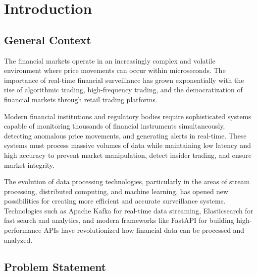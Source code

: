 \chapter{Introduction}

\section{General Context}

The financial markets operate in an increasingly complex and volatile environment where price movements can occur within microseconds. The importance of real-time financial surveillance has grown exponentially with the rise of algorithmic trading, high-frequency trading, and the democratization of financial markets through retail trading platforms.

Modern financial institutions and regulatory bodies require sophisticated systems capable of monitoring thousands of financial instruments simultaneously, detecting anomalous price movements, and generating alerts in real-time. These systems must process massive volumes of data while maintaining low latency and high accuracy to prevent market manipulation, detect insider trading, and ensure market integrity.

The evolution of data processing technologies, particularly in the areas of stream processing, distributed computing, and machine learning, has opened new possibilities for creating more efficient and accurate surveillance systems. Technologies such as Apache Kafka for real-time data streaming, Elasticsearch for fast search and analytics, and modern frameworks like FastAPI for building high-performance APIs have revolutionized how financial data can be processed and analyzed.

\section{Problem Statement}

